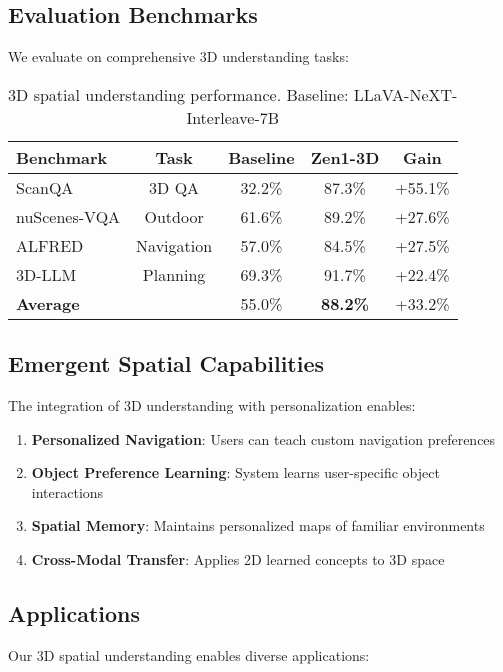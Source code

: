 \subsection{Evaluation Benchmarks}

We evaluate on comprehensive 3D understanding tasks:

\begin{table}[h]
\centering
\begin{tabular}{lcccc}
\toprule
\textbf{Benchmark} & \textbf{Task} & \textbf{Baseline} & \textbf{Zen1-3D} & \textbf{Gain} \\
\midrule
ScanQA & 3D QA & 32.2\% & 87.3\% & +55.1\% \\
nuScenes-VQA & Outdoor & 61.6\% & 89.2\% & +27.6\% \\
ALFRED & Navigation & 57.0\% & 84.5\% & +27.5\% \\
3D-LLM & Planning & 69.3\% & 91.7\% & +22.4\% \\
\midrule
\textbf{Average} & & 55.0\% & \textbf{88.2\%} & +33.2\% \\
\bottomrule
\end{tabular}
\caption{3D spatial understanding performance. Baseline: LLaVA-NeXT-Interleave-7B}
\end{table}

\subsection{Emergent Spatial Capabilities}

The integration of 3D understanding with \bitdelta{} personalization enables:

\begin{enumerate}
    \item \textbf{Personalized Navigation}: Users can teach custom navigation preferences
    \item \textbf{Object Preference Learning}: System learns user-specific object interactions
    \item \textbf{Spatial Memory}: Maintains personalized maps of familiar environments
    \item \textbf{Cross-Modal Transfer}: Applies 2D learned concepts to 3D space
\end{enumerate}

\subsection{Applications}

Our 3D spatial understanding enables diverse applications:

